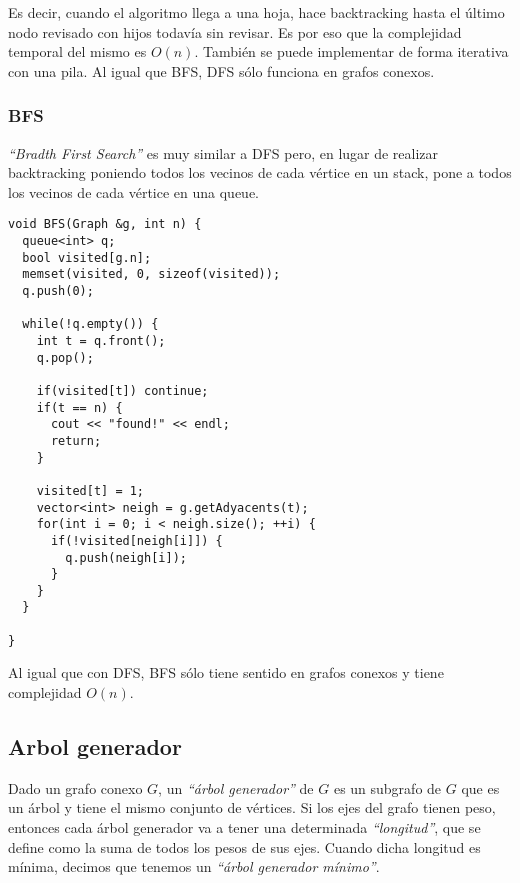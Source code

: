 Es decir, cuando el algoritmo llega a una hoja, hace backtracking hasta el \'ultimo nodo revisado con hijos todav\'ia sin revisar. Es por eso que la complejidad temporal del mismo es $O(n)$. Tambi\'en se puede implementar de forma iterativa con una pila. Al igual que BFS, DFS s\'olo funciona en grafos conexos.

\newpage
\subsubsection{BFS}

\emph{``Bradth First Search''} es muy similar a DFS pero, en lugar de realizar backtracking poniendo todos los vecinos de cada v\'ertice en un stack, pone a todos los vecinos de cada v\'ertice en una queue.
\vspace{8px}

\begin{center}
\begin{minipage}{0.78\textwidth}
\begin{lstlisting}[frame=lrtb]
void BFS(Graph &g, int n) {
  queue<int> q;
  bool visited[g.n];
  memset(visited, 0, sizeof(visited));
  q.push(0);

  while(!q.empty()) {
    int t = q.front();
    q.pop();

    if(visited[t]) continue;
    if(t == n) {
      cout << "found!" << endl;
      return;
    }

    visited[t] = 1;
    vector<int> neigh = g.getAdyacents(t); 
    for(int i = 0; i < neigh.size(); ++i) {
      if(!visited[neigh[i]]) {
        q.push(neigh[i]);
      }
    }
  }

}
\end{lstlisting}
\end{minipage}
\end{center}

Al igual que con DFS, BFS s\'olo tiene sentido en grafos conexos y tiene complejidad $O(n)$.

\newpage
\subsection{Arbol generador}

Dado un grafo conexo $G$, un \emph{``\'arbol generador''} de $G$ es un subgrafo de $G$ que es un \'arbol y tiene el mismo conjunto de v\'ertices. Si los ejes del grafo tienen peso, entonces cada \'arbol generador va a tener una determinada \emph{``longitud''}, que se define como la suma de todos los pesos de sus ejes. Cuando dicha longitud es m\'inima, decimos que tenemos un \emph{``\'arbol generador m\'inimo''}.


